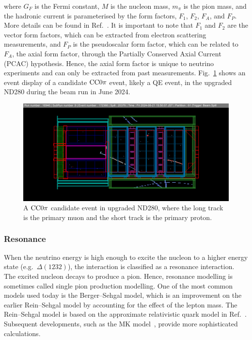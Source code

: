 where $G_F$ is the Fermi constant, $M$ is the nucleon mass, $m_\pi$ is the pion mass, and the hadronic current is parameterised by the form factors, $F_1$, $F_2$, $F_A$, and $F_P$.
More details can be found in Ref.~\cite{LlewellynSmith:1978te}.
It is important to note that $F_1$ and $F_2$ are the vector form factors, which can be extracted from electron scattering measurements, and $F_P$ is the pseudoscalar form factor, which can be related to $F_A$, the axial form factor, through the Partially Conserved Axial Current (PCAC) hypothesis.
Hence, the axial form factor is unique to neutrino experiments and can only be extracted from past measurements.
Fig.~\ref{fig:cc0pi} shows an event display of a candidate $\textrm{CC}0\pi$ event, likely a QE event, in the upgraded ND280 during the beam run in June 2024.

\begin{figure}[!htb] 	
    \centering 		
    \includegraphics[width=\sgfigwid\textwidth]{figures/cc0pi.png}
    \caption{\label{fig:cc0pi} A $\textrm{CC}0\pi$ candidate event in upgraded ND280, where the long track is the primary muon and the short track is the primary proton.} 
\end{figure}

\subsubsection{Resonance}
When the neutrino energy is high enough to excite the nucleon to a higher energy state (e.g.\ $\Delta(1232)$), the interaction is classified as a resonance interaction.
The excited nucleon decays to produce a pion. 
Hence, resonance modelling is sometimes called single pion production modelling.
One of the most common models used today is the Berger–Sehgal model, which is an improvement on the earlier Rein–Sehgal model by accounting for the effect of the lepton mass.
The Rein–Sehgal model is based on the approximate relativistic quark model in Ref.~\cite{Feynman:1971wr}.
Subsequent developments, such as the MK model~\cite{Kabirnezhad:2017jmf,Kabirnezhad:2020wtp,Kabirnezhad:2022znc}, provide more sophisticated calculations.

